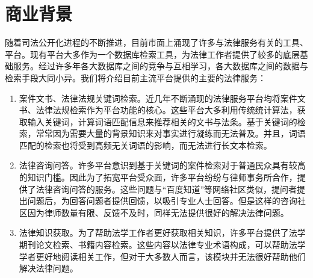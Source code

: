 \section{商业背景}
随着司法公开化进程的不断推进，目前市面上涌现了许多与法律服务有关的工具、平台。现有平台大多作为一个数据库检索工具，为法律工作者提供了较多的底层基础服务。经过许多年各大数据库之间的竞争与互相学习，各大数据库之间的数据与检索手段大同小异。我们将介绍目前主流平台提供的主要的法律服务：
\begin{enumerate}[1)]
	\item 案件文书、法律法规关键词检索。近几年不断涌现的法律服务平台均将案件文书、法律法规检索作为平台功能的核心。这些平台大多利用传统统计算法，获取输入关键词，计算词语匹配信息来推荐相关的文书与法条。基于关键词的检索，常常因为需要大量的背景知识来对事实进行凝练而无法普及。并且，词语匹配的检索也将受到高频无关词语的影响，而无法进行长文本检索。
	\item 法律咨询问答。许多平台意识到基于关键词的案件检索对于普通民众具有较高的知识门槛。因此为了拓宽平台受众面，许多平台纷纷与律师事务所合作，提供了法律咨询问答的服务。这些问题与“百度知道”等网络社区类似，提问者提出问题后，为回答问题者提供回馈，以吸引专业人士回答。但是这样的咨询社区因为律师数量有限、反馈不及时，同样无法提供很好的解决法律问题。
	\item 法律知识获取。为了帮助法学工作者更好获取相关知识，许多平台提供了法学期刊论文检索、书籍内容检索。这些内容以法律专业术语构成，可以帮助法学学者更好地阅读相关工作，但对于大多数人而言，该模块并无法很好帮助他们解决法律问题。
\end{enumerate}
~\\

